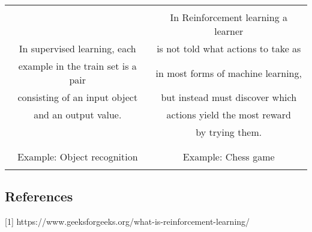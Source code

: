 \begin{center}
\begin{tabular}{| c | c |}
 \hline
                                     &    \\
                                     & In Reinforcement learning a learner \\
 In supervised learning, each        & is not told what actions to take as\\
 example in the train set is a pair  & in most forms of machine learning,\\
 consisting of an input object       & but instead must discover which\\
 and an output value.                & actions yield the most reward\\
                                     & by trying them.\\
                                     &    \\
 \hline
                                     &    \\
Example: Object recognition          & Example: Chess game \\
                                     &    \\
 \hline
\end{tabular}
\end{center}
\subsection*{References}
   [1] https://www.geeksforgeeks.org/what-is-reinforcement-learning/  \newline